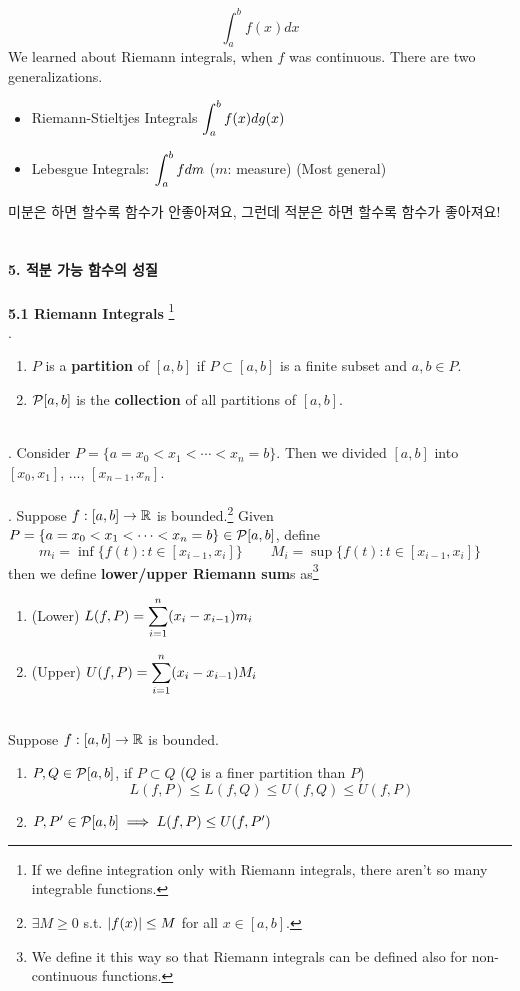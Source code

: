 \pagebreak
$$\int_a^b f(x) dx$$
We learned about Riemann integrals, when $f$ was continuous. There are two generalizations.
\begin{itemize}
	\item Riemann-Stieltjes Integrals $\displaystyle \int_a^b f(x) dg(x)$
	\item Lebesgue Integrals: $\displaystyle \int_a^b f dm$ ($m$: measure) (Most general)
\end{itemize}
미분은 하면 할수록 함수가 안좋아져요, 그런데 적분은 하면 할수록 함수가 좋아져요!\\
\\
\\
\textbf{\large 5. 적분 가능 함수의 성질}\\
\\
\textbf{5.1 Riemann Integrals}
\footnote{If we define integration only with Riemann integrals, there aren't so many integrable functions.}\\
. 
\begin{enumerate}
	\item $P$ is a \textbf{partition} of $[a, b]$ if $P\subset [a, b]$ is a finite subset and $a, b\in P$.
	\item $\mathcal{P}[a, b]$ is the \textbf{collection} of all partitions of $[a, b]$. 
\end{enumerate}~\\
\ex. Consider $P = \{a = x_0 < x_1 < \cdots < x_n=b \}$. Then we divided $[a, b]$ into $[x_0, x_1]$, $\dots$, $[x_{n-1}, x_n]$.\\
\\
. Suppose $f:[a, b]\rightarrow \mathbb{R}$ is bounded.\footnote{$\exists M \geq 0$ s.t. $\left|f(x)\right| \leq M$ for all $x\in [a, b]$.} Given $P = \{a = x_0 < x_1 < \cdots < x_n=b \} \in \mathcal{P}[a, b]$, define
$$m_i = \inf\{f(t): t\in [x_{i-1}, x_i] \} \qquad M_i = \sup\{f(t): t\in [x_{i-1}, x_i] \}$$
then we define \textbf{lower/upper Riemann sum}s as\footnote{We define it this way so that Riemann integrals can be defined also for non-continuous functions.}
\begin{enumerate}
	\item (Lower) $L(f, P) = \displaystyle \sum_{i=1}^n (x_i-x_{i-1}) m_i$
	\item (Upper) $U(f, P) = \displaystyle \sum_{i=1}^n (x_i-x_{i-1}) M_i$
\end{enumerate}~\\
 Suppose $f:[a, b]\rightarrow\mathbb{R}$ is bounded.
\begin{enumerate}
	\item $P, Q\in \mathcal{P}[a, b]$, if $P\subset Q$ ($Q$ is a finer partition than $P$)
	$$L(f, P) \leq L(f, Q)\leq U(f, Q)\leq U(f, P)$$
	\item $P, P' \in \mathcal{P}[a, b] \implies L(f, P)\leq U(f, P')$
\end{enumerate}

